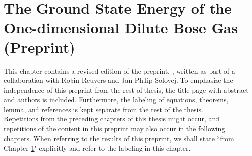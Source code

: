 \chapter{The Ground State Energy of the One-dimensional Dilute Bose Gas (Preprint)}\label{ChapterTheGroundStateEnergyOfTheOneDimensionalDiluteBoseGas}
This chapter contains a revised edition of the preprint, \cite{agerskov2022ground}, written as part of a collaboration with Robin Reuvers and Jan Philip Solovej. To emphasize the independence of this preprint from the rest of thesis, the title page with abstract and authors is included. Furthermore, the labeling of equations, theorems, lemma, and references is kept separate from the rest of the thesis.\\
Repetitions from the preceding chapters of this thesis might occur, and repetitions of the content in this preprint may also occur in the following chapters. When referring to the results of this preprint, we shall state ``from Chapter \ref{ChapterTheGroundStateEnergyOfTheOneDimensionalDiluteBoseGas}" explicitly and refer to the labeling in this chapter.

%

